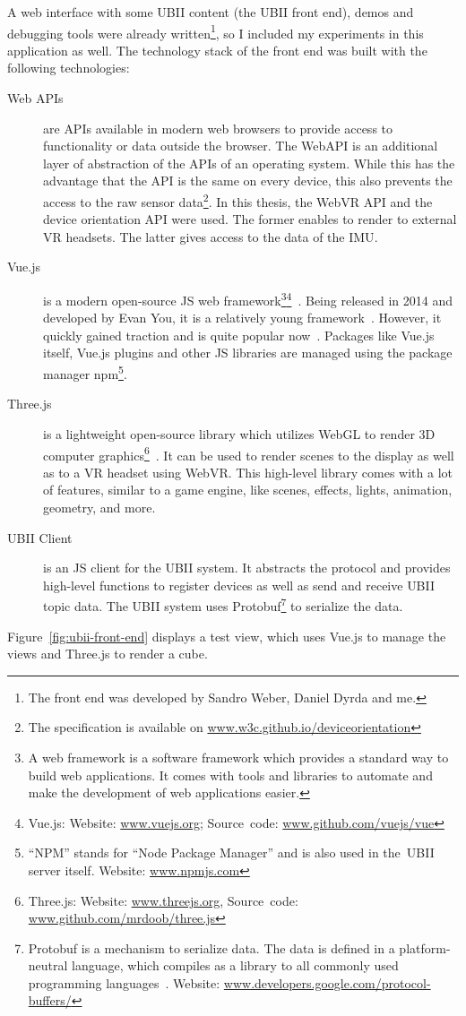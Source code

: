 A web interface with some \ac{UBII} content (the \ac{UBII} front end), demos and debugging tools were already written\footnote{The front end was developed by Sandro Weber, Daniel Dyrda and me.}, so I included my experiments in this application as well. The technology stack of the front end was built with the following technologies:
\begin{description}
  \item[Web APIs] are \acfp{API} available in modern web browsers to provide access to functionality or data outside the browser. The WebAPI is an additional layer of abstraction of the \acp{API} of an operating system. While this has the advantage that the API is the same on every device, this also prevents the access to the raw sensor data\footnote{The specification is available on \href{https://w3c.github.io/deviceorientation/}{www.w3c.github.io/deviceorientation}}. In this thesis, the WebVR \ac{API} and the device orientation \ac{API} were used. The former enables to render to external \ac{VR} headsets. The latter gives access to the data of the \acf{IMU}.
  \item[Vue.js] is a modern open-source \acl{JS} web framework\footnote{A web framework is a software framework which provides a standard way to build web applications. It comes with tools and libraries to automate and make the development of web applications easier.}\footnote{Vue.js: Website: \href{https://vuejs.org/}{www.vuejs.org}; Source~code: \href{https://github.com/vuejs/vue}{www.github.com/vuejs/vue}}~\cite{You.2019}. Being released in 2014 and developed by Evan You, it is a relatively young framework~\cite[17]{Koetsier.2016}. However, it quickly gained traction and is quite popular now~\cite[12\psq]{Koetsier.2016}.
  Packages like Vue.js itself, Vue.js plugins and other \acl{JS} libraries are managed using the package manager npm\footnote{\enquote{NPM} stands for \enquote{Node Package Manager} and is also used in the~\ac{UBII} server itself. Website: \href{https://www.npmjs.com/}{www.npmjs.com}}.
  \item[Three.js] is a lightweight open-source library which utilizes WebGL to render \ac{3D} computer graphics\footnote{Three.js: Website: \href{https://threejs.org/}{www.threejs.org}, Source~code: \href{https://github.com/mrdoob/three.js/}{www.github.com/mrdoob/three.js}}~\cite{Cabello.2019}. It can be used to render scenes to the display as well as to a VR headset using WebVR. This high-level library comes with a lot of features, similar to a game engine, like scenes, effects, lights, animation, geometry, and more.
  \item[UBII Client] is an \acl{JS} client for the \ac{UBII} system. It abstracts the protocol and provides high-level functions to register devices as well as send and receive \ac{UBII} topic data. The UBII system uses \acf{Protobuf}\footnote{Protobuf is a mechanism to serialize data. The data is defined in a platform-neutral language, which compiles as a library to all commonly used programming languages~\cite{GoogleLLC.2019b}. Website: \href{https://developers.google.com/protocol-buffers/}{www.developers.google.com/protocol-buffers/}} to serialize the data.
\end{description}

Figure~\ref{fig:ubii-front-end} displays a test view, which uses Vue.js to manage the views and Three.js to render a cube.